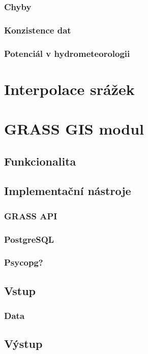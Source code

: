 \documentclass[a4paper,12pt]{article}
\begin{document}





\subsubsection{Chyby}
\subsubsection{Konzistence dat}
\subsubsection{Potenciál v hydrometeorologii}


\section{Interpolace srážek}

\section{GRASS GIS modul}
\subsection{Funkcionalita}
\subsection{Implementační nástroje}
\subsubsection{GRASS API}
\subsubsection{PostgreSQL}
\subsubsection{Psycopg?}
\subsection{Vstup}   
\subsubsection{Data}
\subsection{Výstup}
\end{document}

